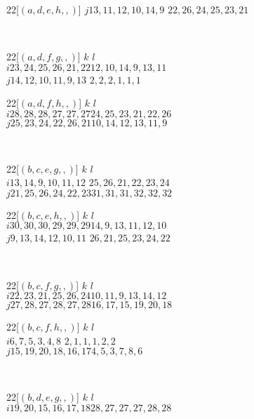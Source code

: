 \begin{example}
\begin{center}
\begin{game}{2}{2}[$(a,d,e,h,,)$]
	$j$\>$13,11,12,10,14,9$ \>$22,26,24,25,23,21$  
\end{game}
\\
\begin{game}{2}{2}[$(a,d,f,g,,)$]
	\>$k$                  \>$l$   \\
	$i$\>$23,24,25,26,21,22$\>$12,10,14,9,13,11$\\
	$j$\>$14,12,10,11,9,13$ \>$2,2,2,1,1,1$       
\end{game}
\hspace*{5mm}
\begin{game}{2}{2}[$(a,d,f,h,,)$]
	\>$k$                  \>$l$  \\
	$i$\>$28,28,28,27,27,27$\>$24,25,23,21,22,26$\\
	$j$\>$25,23,24,22,26,21$\>$10,14,12,13,11,9$   
\end{game}
\\
\begin{game}{2}{2}[$(b,c,e,g,,)$]
	\>$k$                  \>$l$  \\
	$i$\>$13,14,9,10,11,12$ \>$25,26,21,22,23,24$\\
	$j$\>$21,25,26,24,22,23$\>$31,31,31,32,32,32$  
\end{game}
\hspace*{5mm}
\begin{game}{2}{2}[$(b,c,e,h,,)$]
	\>$k$                  \>$l$  \\
	$i$\>$30,30,30,29,29,29$\>$14,9,13,11,12,10$\\
	$j$\>$9,13,14,12,10,11$ \>$26,21,25,23,24,22$  
\end{game}
\\
\begin{game}{2}{2}[$(b,c,f,g,,)$]
	\>$k$                  \>$l$  \\
	$i$\>$22,23,21,25,26,24$\>$10,11,9,13,14,12$\\
	$j$\>$27,28,27,28,27,28$\>$16,17,15,19,20,18$  
\end{game}
\hspace*{5mm}
\begin{game}{2}{2}[$(b,c,f,h,,)$]
	\>$k$                  \>$l$  \\
	$i$\>$6,7,5,3,4,8$      \>$2,1,1,1,2,2$\\
	$j$\>$15,19,20,18,16,17$\>$4,5,3,7,8,6$  
\end{game}
\\
\begin{game}{2}{2}[$(b,d,e,g,,)$]
	\>$k$                  \>$l$  \\
	$i$\>$19,20,15,16,17,18$\>$28,27,27,27,28,28$\\

\end{game}
\end{center}
\end{example}
